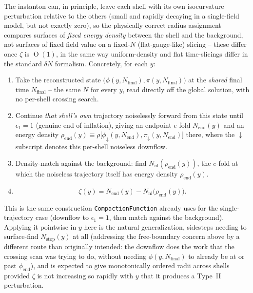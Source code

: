 \documentclass[a4paper,11pt]{article}
\newcommand{\semibold}[1]{{\fontseries{b}\selectfont{#1}}}
\DeclareMathOperator{\Or}{O}
\newcommand{\Ny}{N}                          %
\newcommand{\Nfinal}{N_{\mathrm{final}}}     %
\newcommand{\epsSR}{\epsilon_1}              %
\newcommand{\field}{\phi}                    %
\newcommand{\mom}{\pi}                       %
\newcommand{\phiend}{\field_{\mathrm{end}}}
\newcommand{\yco}{y}                         %
\newcommand{\zprofile}{\zeta}                %
\begin{document}
\par\vspace{0.5em}\noindent
\semibold{Scale assignment: density matching, not a crossing scan.}
The instanton can, in principle, leave each shell with its own
isocurvature perturbation relative to the others (small and rapidly
decaying in a single-field model, but not exactly zero), so the physically
correct radius assignment compares surfaces of \emph{fixed energy density}
between the shell and the background, not surfaces of fixed field value on
a fixed-$\Ny$ (flat-gauge-like) slicing -- these differ once $\zprofile$ is
$\Or(1)$, in the same way uniform-density and flat time-slicings differ in
the standard $\delta N$ formalism. Concretely, for each $\yco$:
\begin{enumerate}
    \item Take the reconstructed state $\big(\field(\yco,\Nfinal),\mom(\yco,\Nfinal)\big)$
    at the \emph{shared} final time $\Nfinal$ -- the same $\Ny$ for every
    $\yco$, read directly off the global solution, with no per-shell
    crossing search.
    \item Continue \emph{that shell's own} trajectory noiselessly forward
    from this state until $\epsSR=1$ (genuine end of inflation), giving an
    endpoint $e$-fold $\Ny_{\mathrm{end}}(\yco)$ and an energy density
    $\rho_{\mathrm{end}}(\yco) \equiv \rho\big[\field_{\downarrow}(\yco,\Ny_{\mathrm{end}}),
    \mom_{\downarrow}(\yco,\Ny_{\mathrm{end}})\big]$ there, where the
    $\downarrow$ subscript denotes this per-shell noiseless downflow.
    \item Density-match against the background: find $\Ny_{\mathrm{nl}}(\rho_{\mathrm{end}}(\yco))$,
    the $e$-fold at which the noiseless trajectory itself has energy
    density $\rho_{\mathrm{end}}(\yco)$.
    \item
    \begin{equation}
        \zprofile(\yco) = \Ny_{\mathrm{end}}(\yco) - \Ny_{\mathrm{nl}}\big(\rho_{\mathrm{end}}(\yco)\big) .
        \label{eq:zeta-extraction}
    \end{equation}
\end{enumerate}
This is the same construction \texttt{CompactionFunction} already uses for
the single-trajectory case (downflow to $\epsSR=1$, then match against the
background).
Applying it pointwise in $\yco$ here is the natural generalization,
sidesteps needing to surface-find $\Ny_{\mathrm{stop}}(\yco)$ at all
(addressing the free-boundary concern above by a different route than
originally intended: the downflow does the work that the crossing scan
was trying to do, without needing $\field(\yco,\Nfinal)$ to already be at
or past $\phiend$), and is expected to give monotonically ordered radii
across shells provided $\zprofile$ is not increasing so rapidly with
$\yco$ that it produces a Type~II perturbation.
\end{document}
